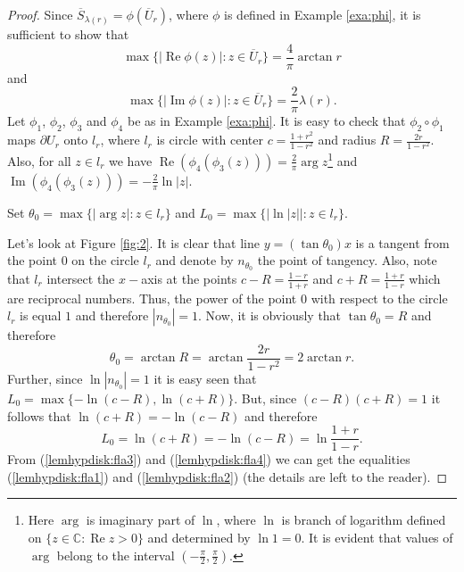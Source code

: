 \documentclass{amsart}
\newcommand{\re}{\mathop{\mathrm{Re}}}
\newcommand{\im}{\mathop{\mathrm{Im}}}
\begin{document}
\begin{proof} Since $\overline{S}_{\lambda(r)}=\phi(\overline{U}_r)$, where $\phi$ is defined in Example \ref{exa:phi}, it is sufficient to show that
\begin{equation}\label{lemhypdisk:fla1}
    \max\{|\re{\phi(z)}|:z\in \overline{U}_r\}=\frac{4}{\pi}\arctan{r}
\end{equation}
and
\begin{equation}\label{lemhypdisk:fla2}
    \max\{|\im{\phi(z)}|:z\in \overline{U}_r\}=\frac{2}{\pi}\lambda(r).
\end{equation}
Let $\phi_1$, $\phi_2$, $\phi_3$ and $\phi_4$ be as in Example \ref{exa:phi}. It is easy to check that $\phi_2\circ\phi_1$ maps  $\partial U_r$ onto $l_r$, where $l_r$ is circle with center $\displaystyle c=\frac{1+r^2}{1-r^2}$ and radius $\displaystyle R=\frac{2r}{1-r^2}$. Also, for all $z\in l_r$ we have $\re(\phi_4(\phi_3(z)))=\displaystyle\frac{2}{\pi}\arg{z}$\footnote{Here $\arg$ is imaginary part of $\ln$, where $\ln$ is branch of logarithm  defined on $\{z\in\mathbb{C}:\re{z}>0\}$ and determined by $\ln{1}=0$. It is evident that values of $\arg$ belong to the interval $\displaystyle\left(-\frac{\pi}{2},\frac{\pi}{2}\right)$.} and $\im(\phi_4(\phi_3(z)))=-\displaystyle\frac{2}{\pi}\ln{|z|}$.

Set $\theta_0=\max\{|\arg{z}|:z\in l_r\}$ and $L_0=\max\{|\ln{|z|}|:z\in l_r\}$.

Let's look at Figure \ref{fig:2}.  It is clear that line $y=(\tan{\theta_0})x$ is a tangent from the point $0$ on the circle $l_r$ and denote by $n_{\theta_0}$ the point of tangency. Also, note that $l_r$ intersect the $x-$axis at the points $\displaystyle c-R=\frac{1-r}{1+r}$ and $\displaystyle c+R=\frac{1+r}{1-r}$ which are reciprocal numbers. Thus, the power of the point $0$ with respect to the circle $l_r$ is equal $1$ and therefore $|n_{\theta_0}|=1$.  Now, it is obviously that $\tan{\theta_0}=R$ and therefore
\begin{equation}\label{lemhypdisk:fla3}
    \theta_0=\arctan{R}=\arctan{\frac{2r}{1-r^2}}=2\arctan{r}.
\end{equation}
Further, since $\ln|n_{\theta_0}|=1$ it is easy seen that $L_0=\max\{-\ln(c-R),\ln(c+R)\}$. But, since $(c-R)(c+R)=1$ it follows that $\ln(c+R)=-\ln(c-R)$ and therefore
\begin{equation}\label{lemhypdisk:fla4}
    L_0=\ln(c+R)=-\ln(c-R)=\ln{\frac{1+r}{1-r}}.
\end{equation}
From (\ref{lemhypdisk:fla3}) and (\ref{lemhypdisk:fla4}) we can get the equalities (\ref{lemhypdisk:fla1}) and (\ref{lemhypdisk:fla2}) (the details are left to the reader).


\end{proof}
\end{document}
